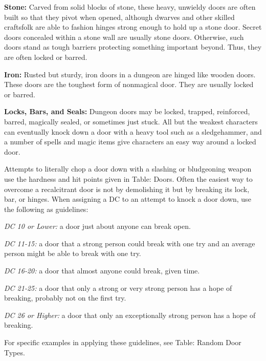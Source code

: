 \textbf{Stone:} Carved from solid blocks of stone, these heavy, unwieldy doors are often built so that they pivot when opened, although dwarves and other skilled craftsfolk are able to fashion hinges strong enough to hold up a stone door. Secret doors concealed within a stone wall are usually stone doors. Otherwise, such doors stand as tough barriers protecting something important beyond. Thus, they are often locked or barred.

\textbf{Iron:} Rusted but sturdy, iron doors in a dungeon are hinged like wooden doors. These doors are the toughest form of nonmagical door. They are usually locked or barred.

\textbf{Locks, Bars, and Seals:} Dungeon doors may be locked, trapped, reinforced, barred, magically sealed, or sometimes just stuck. All but the weakest characters can eventually knock down a door with a heavy tool such as a sledgehammer, and a number of spells and magic items give characters an easy way around a locked door.

Attempts to literally chop a door down with a slashing or bludgeoning weapon use the hardness and hit points given in Table: Doors. Often the easiest way to overcome a recalcitrant door is not by demolishing it but by breaking its lock, bar, or hinges. When assigning a DC to an attempt to knock a door down, use the following as guidelines:

\textit{DC 10 or Lower:} a door just about anyone can break open.

\textit{DC 11-15:} a door that a strong person could break with one try and an 
average person might be able to break with one try. 

\textit{DC 16-20:} a door that almost anyone could break, given time.

\textit{DC 21-25:} a door that only a strong or very strong person has a hope of breaking, probably not on the first try.

\textit{DC 26 or Higher:} a door that only an exceptionally strong person has a hope of breaking.

For specific examples in applying these guidelines, see Table: Random Door Types. 

\textbf{Locks:} Dungeon doors are often locked, and thus the Open Lock skill comes in very handy. Locks are usually built into the door, either on the edge opposite the hinges or right in the middle of the door. Builtin locks either control an iron bar that juts out of the door and into the wall of its frame, or else a sliding iron bar or heavy wooden bar that rests behind the entire door. By contrast, padlocks are not built-in but usually run through two rings, one on the door and the other on the wall. More complex locks, such as combination locks and puzzle locks, are usually built into the door itself. Because such keyless locks are larger and more complex, they are typically only found in sturdy doors (strong wooden, stone, or iron doors).

